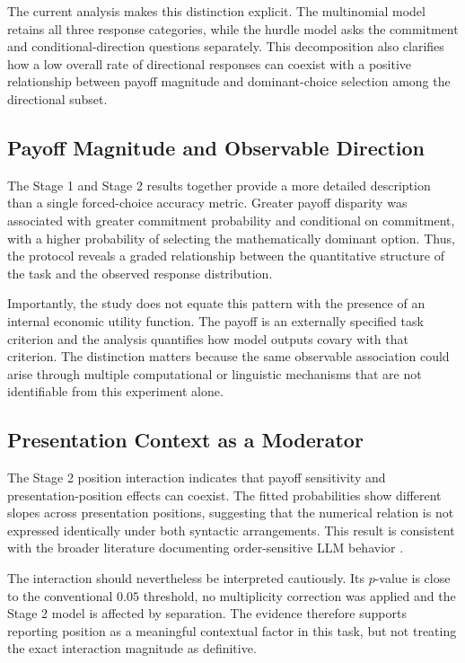 \documentclass[10pt,journal,compsoc]{IEEEtran}
\begin{document}
The current analysis makes this distinction explicit. The multinomial model retains all three response categories, while the hurdle model asks the commitment and conditional-direction questions separately. This decomposition also clarifies how a low overall rate of directional responses can coexist with a positive relationship between payoff magnitude and dominant-choice selection among the directional subset.

\subsection{Payoff Magnitude and Observable Direction}
The Stage 1 and Stage 2 results together provide a more detailed description than a single forced-choice accuracy metric. Greater payoff disparity was associated with greater commitment probability and conditional on commitment, with a higher probability of selecting the mathematically dominant option. Thus, the protocol reveals a graded relationship between the quantitative structure of the task and the observed response distribution.

Importantly, the study does not equate this pattern with the presence of an internal economic utility function. The payoff is an externally specified task criterion and the analysis quantifies how model outputs covary with that criterion. The distinction matters because the same observable association could arise through multiple computational or linguistic mechanisms that are not identifiable from this experiment alone.

\subsection{Presentation Context as a Moderator}
The Stage 2 position interaction indicates that payoff sensitivity and presentation-position effects can coexist. The fitted probabilities show different slopes across presentation positions, suggesting that the numerical relation is not expressed identically under both syntactic arrangements. This result is consistent with the broader literature documenting order-sensitive LLM behavior \cite{fragile_preferences_2026}.

The interaction should nevertheless be interpreted cautiously. Its $p$-value is close to the conventional $0.05$ threshold, no multiplicity correction was applied and the Stage 2 model is affected by separation. The evidence therefore supports reporting position as a meaningful contextual factor in this task, but not treating the exact interaction magnitude as definitive.
\end{document}
